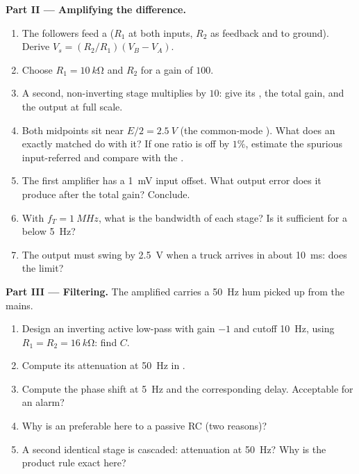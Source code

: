 \begin{problem}
\medskip
\noindent\textbf{Part II --- Amplifying the difference.}
\begin{enumerate}[resume]
  \item The followers feed a  ($R_1$ at both
        inputs, $R_2$ as feedback and to ground). Derive $V_s =
        (R_2/R_1)(V_B - V_A)$.
  \item Choose $R_1 = \qty{10}{k\ohm}$ and $R_2$ for a gain of $100$.
  \item A second, non-inverting stage multiplies by $10$: give its
        , the total gain, and the output at full scale.
  \item Both midpoints sit near $E/2 = \qty{2.5}{V}$ (the common-mode
        ). What does an exactly matched  do
        with it? If one  ratio is off by $1\%$, estimate the
        spurious input-referred  and compare with the .
  \item The first amplifier has a \qty{1}{mV} input offset. What output
        error does it produce after the total gain? Conclude.
  \item With $f_T = \qty{1}{MHz}$, what is the bandwidth of each stage?
        Is it sufficient for a  below \qty{5}{Hz}?
  \item The output must swing by \qty{2.5}{V} when a truck arrives in
        about \qty{10}{ms}: does the  limit?
\end{enumerate}

\medskip
\noindent\textbf{Part III --- Filtering.}
The amplified  carries a \qty{50}{Hz} hum picked up from the
mains.
\begin{enumerate}[resume]
  \item Design an inverting active low-pass with gain $-1$ and cutoff
        \qty{10}{Hz}, using $R_1 = R_2 = \qty{16}{k\ohm}$: find $C$.
  \item Compute its attenuation at \qty{50}{Hz} in .
  \item Compute the phase shift at \qty{5}{Hz} and the corresponding
        delay. Acceptable for an alarm?
  \item Why is an  preferable here to a passive RC
        (two reasons)?
  \item A second identical stage is cascaded: attenuation at \qty{50}{Hz}?
        Why is the product rule exact here?
\end{enumerate}


\end{problem}
